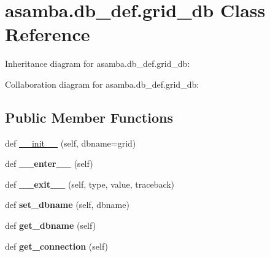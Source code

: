 \hypertarget{classasamba_1_1db__def_1_1grid__db}{}\section{asamba.\+db\+\_\+def.\+grid\+\_\+db Class Reference}
\label{classasamba_1_1db__def_1_1grid__db}


Inheritance diagram for asamba.\+db\+\_\+def.\+grid\+\_\+db\+:


Collaboration diagram for asamba.\+db\+\_\+def.\+grid\+\_\+db\+:
\subsection*{Public Member Functions}
\begin{DoxyCompactItemize}
\item 
def \hyperlink{classasamba_1_1db__def_1_1grid__db_a12b1aeeefe8ddf8d57ccf1dcdcd005c9}{\+\_\+\+\_\+init\+\_\+\+\_\+} (self, dbname=\textquotesingle{}grid\textquotesingle{})
\item 
\mbox{\label{classasamba_1_1db__def_1_1grid__db_af2a0cdd429c6950b2249f82b5f7dfeef}} 
def {\bfseries \+\_\+\+\_\+enter\+\_\+\+\_\+} (self)
\item 
\mbox{\label{classasamba_1_1db__def_1_1grid__db_abc828560d7bb0461523e3fb37f39363e}} 
def {\bfseries \+\_\+\+\_\+exit\+\_\+\+\_\+} (self, type, value, traceback)
\item 
\mbox{\label{classasamba_1_1db__def_1_1grid__db_a43dc9b5ca0cf36c0a909c4e50d82b3e8}} 
def {\bfseries set\+\_\+dbname} (self, dbname)
\item 
\mbox{\label{classasamba_1_1db__def_1_1grid__db_a859f69f616f06e33cafc9ac0842b3565}} 
def {\bfseries get\+\_\+dbname} (self)
\item 
\mbox{\label{classasamba_1_1db__def_1_1grid__db_adc63edf75b2ea29a914e32b12dee1225}} 
def {\bfseries get\+\_\+connection} (self)
\item 
\mbox{\label{classasamba_1_1db__def_1_1grid__db_a29743c71be554a438f7fedeb4cce91c8}} 

\end{DoxyCompactItemize}
